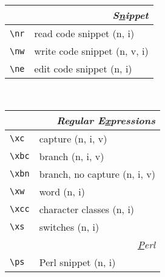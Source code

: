 \documentclass[oneside,10pt,landscape,DIV16]{scrartcl}
\begin{document}
\begin{multicols}{3}
\begin{center}
\begin{tabular}[]{|p{11mm}|p{56mm}|}
\hline
\hline
\multicolumn{2}{|r|}{\textsl{S\underline{n}ippet}}                \\[1.0ex]
\hline \verb'\nr'  & read code snippet         \hfill (n, i)   \\
\hline \verb'\nw'  & write code snippet        \hfill (n, v, i)\\
\hline \verb'\ne'  & edit code snippet         \hfill (n, i)   \\
%
\hline
\end{tabular}\\
%
%
\begin{tabular}[]{|p{11mm}|p{60mm}|}
\hline
\multicolumn{2}{|r|}{\textsl{Regular E\underline{x}pressions}}     \\[1.0ex]
\hline \verb'\xc'  & capture                 \hfill (n, i, v)\\
\hline \verb'\xbc' & branch                  \hfill (n, i, v)\\
\hline \verb'\xbn' & branch, no capture      \hfill (n, i, v)\\
\hline \verb'\xw'  & word                    \hfill (n, i)\\
\hline \verb'\xcc' & character classes       \hfill (n, i)\\
\hline \verb'\xs'  & switches                \hfill (n, i)\\
\hline
\hline
\multicolumn{2}{|r|}{\textsl{\underline{P}erl}}                       \\[1.0ex]
\hline \verb'\ps'   & Perl snippet \hfill (n, i)\\

\end{tabular}
\end{center}
\end{multicols}
\end{document}
